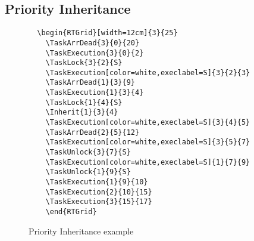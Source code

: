 \documentclass{article}
\begin{document}
\subsection{Priority Inheritance}

\begin{figure}
  \centering
  \begin{RTGrid}[width=12cm]{3}{25}
  \end{RTGrid}
\begin{verbatim}
  \begin{RTGrid}[width=12cm]{3}{25}
    \TaskArrDead{3}{0}{20}
    \TaskExecution{3}{0}{2}
    \TaskLock{3}{2}{S}
    \TaskExecution[color=white,execlabel=S]{3}{2}{3}
    \TaskArrDead{1}{3}{9}  
    \TaskExecution{1}{3}{4}
    \TaskLock{1}{4}{S}
    \Inherit{1}{3}{4}
    \TaskExecution[color=white,execlabel=S]{3}{4}{5}
    \TaskArrDead{2}{5}{12}
    \TaskExecution[color=white,execlabel=S]{3}{5}{7}
    \TaskUnlock{3}{7}{S}
    \TaskExecution[color=white,execlabel=S]{1}{7}{9}
    \TaskUnlock{1}{9}{S}
    \TaskExecution{1}{9}{10}
    \TaskExecution{2}{10}{15}
    \TaskExecution{3}{15}{17}
    \end{RTGrid}
\end{verbatim}
  \caption{Priority Inheritance example}
  \label{fig:ex4}
\end{figure}
\end{document}
